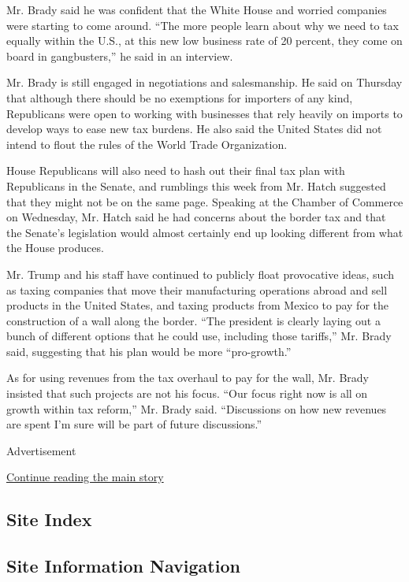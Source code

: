 Mr. Brady said he was confident that the White House and worried
companies were starting to come around. ``The more people learn about
why we need to tax equally within the U.S., at this new low business
rate of 20 percent, they come on board in gangbusters,'' he said in an
interview.

Mr. Brady is still engaged in negotiations and salesmanship. He said on
Thursday that although there should be no exemptions for importers of
any kind, Republicans were open to working with businesses that rely
heavily on imports to develop ways to ease new tax burdens. He also said
the United States did not intend to flout the rules of the World Trade
Organization.

House Republicans will also need to hash out their final tax plan with
Republicans in the Senate, and rumblings this week from Mr. Hatch
suggested that they might not be on the same page. Speaking at the
Chamber of Commerce on Wednesday, Mr. Hatch said he had concerns about
the border tax and that the Senate's legislation would almost certainly
end up looking different from what the House produces.

Mr. Trump and his staff have continued to publicly float provocative
ideas, such as taxing companies that move their manufacturing operations
abroad and sell products in the United States, and taxing products from
Mexico to pay for the construction of a wall along the border. ``The
president is clearly laying out a bunch of different options that he
could use, including those tariffs,'' Mr. Brady said, suggesting that
his plan would be more ``pro-growth.''

As for using revenues from the tax overhaul to pay for the wall, Mr.
Brady insisted that such projects are not his focus. ``Our focus right
now is all on growth within tax reform,'' Mr. Brady said. ``Discussions
on how new revenues are spent I'm sure will be part of future
discussions.''

Advertisement

\protect\hyperlink{after-bottom}{Continue reading the main story}

\hypertarget{site-index}{%
\subsection{Site Index}\label{site-index}}

\hypertarget{site-information-navigation}{%
\subsection{Site Information
Navigation}\label{site-information-navigation}}

